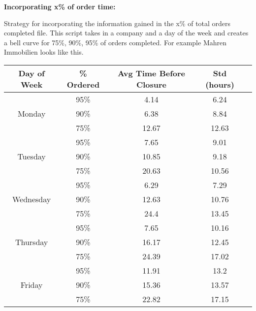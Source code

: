 \documentclass[12pt]{article}
\begin{document}
\vspace{.25cm}

\textbf{Incorporating x\% of order time:} 

Strategy for incorporating the information gained in the x\% of total orders completed file. This script takes in a company and a day of the week and creates a bell curve for 75\%, 90\%, 95\% of orders completed. For example Mahren Immobilien looks like this.

\begin{center}
\begin{tabular}{ |c|c|c|c|c| } 
\hline
Day of Week & \% Ordered & Avg Time Before Closure & Std (hours) \\
\hline
\multirow{3}{4em}{Monday}
& 95\% & 4.14 & 6.24 \\ 
& 90\% & 6.38 & 8.84 \\ 
& 75\% & 12.67 & 12.63 \\ 
\hline
\multirow{3}{4em}{Tuesday}
& 95\% & 7.65 & 9.01 \\ 
& 90\% & 10.85 & 9.18 \\ 
& 75\% & 20.63 & 10.56 \\ 
\hline
\multirow{3}{4em}{Wednesday}
& 95\% & 6.29 & 7.29 \\ 
& 90\% & 12.63 & 10.76 \\ 
& 75\% & 24.4 & 13.45 \\ 
\hline
\multirow{3}{4em}{Thursday}
& 95\% & 7.65 & 10.16 \\ 
& 90\% & 16.17 & 12.45 \\ 
& 75\% & 24.39 & 17.02 \\ 
\hline
\multirow{3}{4em}{Friday}
& 95\% & 11.91 & 13.2\\ 
& 90\% & 15.36 & 13.57 \\ 
& 75\% & 22.82 & 17.15 \\ 
\hline
\end{tabular}
\end{center}
\end{document}
